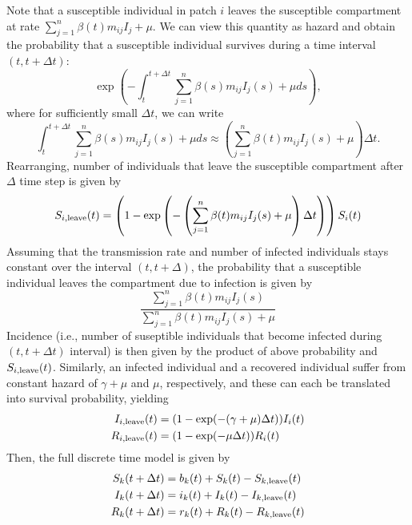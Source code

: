 \documentclass[12pt]{article}
\begin{document}
Note that a susceptible individual in patch $i$ leaves the susceptible compartment at rate $\sum_{j=1}^n \beta(t) m_{ij} I_j + \mu$. We can view this quantity as hazard and obtain the probability that a susceptible individual survives during a time interval $(t, t + \Delta t)$:
\begin{equation}
\exp \left(-\int_{t}^{t + \Delta t} \sum_{j=1}^n \beta(s) m_{ij} I_j(s) + \mu d s \right),
\end{equation}
where for sufficiently small $\Delta t$, we can write
\begin{equation}
\int_{t}^{t + \Delta t} \sum_{j=1}^n \beta(s) m_{ij} I_j(s) + \mu d s \approx \left(\sum_{j=1}^n \beta(t) m_{ij} I_j(s) + \mu \right) \Delta t.
\end{equation}
Rearranging, number of individuals that leave the susceptible compartment after $\Delta$ time step is given by
$$
S_{i, \tiny{\textrm{leave}}}(t) = \left(1 - \exp \left(-\left(\sum_{j=1}^n \beta(t) m_{ij} I_j(s) + \mu \right) \Delta t \right) \right) S_i(t)
$$
Assuming that the transmission rate and number of infected individuals stays constant over the interval $(t, t+\Delta)$, the probability that a susceptible individual leaves the compartment due to infection is given by 
\begin{equation}
\frac{\sum_{j=1}^n \beta(t) m_{ij} I_j(s)}{\sum_{j=1}^n \beta(t) m_{ij} I_j(s) + \mu}
\end{equation}
Incidence (i.e., number of suseptible individuals that become infected during $(t, t+\Delta t)$ interval) is then given by the product of above probability and $S_{i, \tiny{\textrm{leave}}}(t)$.
Similarly, an infected individual and a recovered individual suffer from constant hazard of $\gamma + \mu$ and $\mu$, respectively, and these can each be translated into survival probability, yielding
\begin{equation}
\begin{aligned}
I_{i, \tiny{\textrm{leave}}}(t) &= (1 - \exp(-(\gamma + \mu)\Delta t)) I_i(t) \\
R_{i, \tiny{\textrm{leave}}}(t) &= (1 - \exp(-\mu \Delta t)) R_i(t)
\end{aligned}
\end{equation}
Then, the full discrete time model is given by
\begin{equation}
\label{eq:discretedeterministic}
\begin{aligned}
S_{k}(t+\Delta t) &= b_k(t) + S_k(t) - S_{k, \tiny{\textrm{leave}}}(t)\\
I_{k}(t+\Delta t) &= i_k(t) + I_k(t) - I_{k, \tiny{\textrm{leave}}}(t)\\
R_{k}(t+\Delta t) &= r_k(t) + R_k(t) - R_{k, \tiny{\textrm{leave}}}(t)
\end{aligned}
\end{equation}
\end{document}
